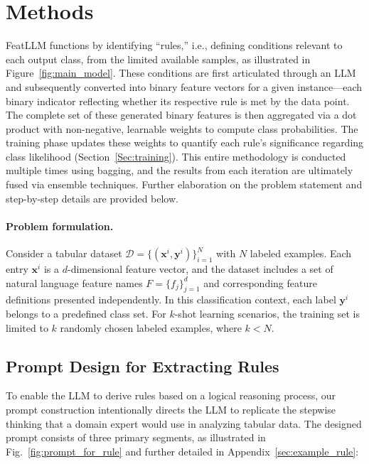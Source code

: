 \section{Methods}
\textsf{FeatLLM} functions by identifying “rules,” i.e., defining conditions relevant to each output class, from the limited available samples, as illustrated in Figure~\ref{fig:main_model}. These conditions are first articulated through an LLM and subsequently converted into binary feature vectors for a given instance—each binary indicator reflecting whether its respective rule is met by the data point. The complete set of these generated binary features is then aggregated via a dot product with non-negative, learnable weights to compute class probabilities. The training phase updates these weights to quantify each rule’s significance regarding class likelihood (Section~\ref{Sec:training}). This entire methodology is conducted multiple times using bagging, and the results from each iteration are ultimately fused via ensemble techniques. Further elaboration on the problem statement and step-by-step details are provided below.

\vspace*{-0.12in}
\paragraph{Problem formulation.} Consider a tabular dataset $\mathcal{D} = \{(\mathbf{x}^i, \mathbf{y}^i)\}_{i=1}^{N}$ with $N$ labeled examples. Each entry $\mathbf{x}^i$ is a $d$-dimensional feature vector, and the dataset includes a set of natural language feature names $F = \{f_j\}_{j=1}^{d}$ and corresponding feature definitions presented independently. In this classification context, each label $\mathbf{y}^i$ belongs to a predefined class set. For $k$-shot learning scenarios, the training set is limited to $k$ randomly chosen labeled examples, where $k<N$.

\subsection{Prompt Design for Extracting Rules}
\label{Sec:prompt_design}
To enable the LLM to derive rules based on a logical reasoning process, our prompt construction intentionally directs the LLM to replicate the stepwise thinking that a domain expert would use in analyzing tabular data. The designed prompt consists of three primary segments, as illustrated in Fig.~\ref{fig:prompt_for_rule} and further detailed in Appendix~\ref{sec:example_rule}:

